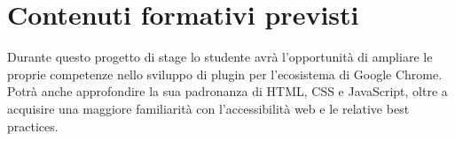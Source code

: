 \section*{Contenuti formativi previsti}
Durante questo progetto di stage lo studente avrà l'opportunità di ampliare le proprie competenze nello sviluppo di plugin per l'ecosistema di Google Chrome. Potrà anche approfondire la sua padronanza di HTML, CSS e JavaScript, oltre a acquisire una maggiore familiarità con l'accessibilità web e le relative best practices.
\newpage